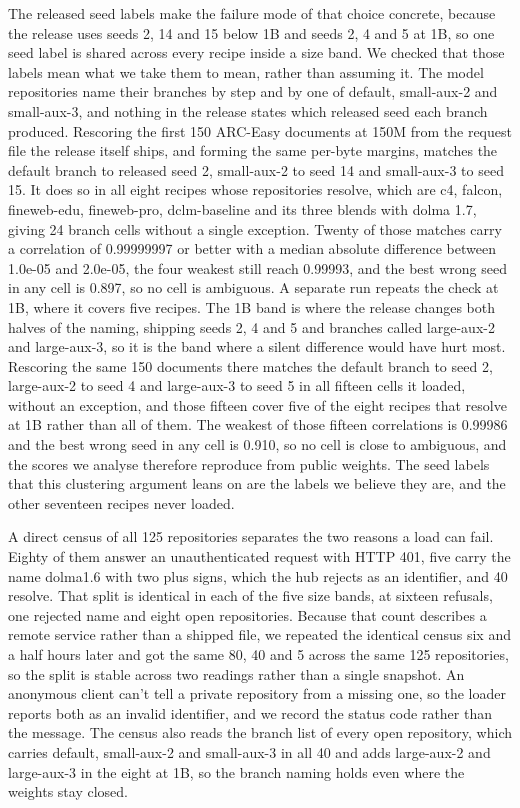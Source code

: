 The released seed labels make the failure mode of that choice concrete, because the release uses seeds 2, 14 and 15 below 1B and seeds 2, 4 and 5 at 1B, so one seed label is shared across every recipe inside a size band. We checked that those labels mean what we take them to mean, rather than assuming it. The model repositories name their branches by step and by one of default, small-aux-2 and small-aux-3, and nothing in the release states which released seed each branch produced. Rescoring the first 150 ARC-Easy documents at 150M from the request file the release itself ships, and forming the same per-byte margins, matches the default branch to released seed 2, small-aux-2 to seed 14 and small-aux-3 to seed 15. It does so in all eight recipes whose repositories resolve, which are c4, falcon, fineweb-edu, fineweb-pro, dclm-baseline and its three blends with dolma 1.7, giving 24 branch cells without a single exception. Twenty of those matches carry a correlation of 0.99999997 or better with a median absolute difference between 1.0e-05 and 2.0e-05, the four weakest still reach 0.99993, and the best wrong seed in any cell is 0.897, so no cell is ambiguous. A separate run repeats the check at 1B, where it covers five recipes. The 1B band is where the release changes both halves of the naming, shipping seeds 2, 4 and 5 and branches called large-aux-2 and large-aux-3, so it is the band where a silent difference would have hurt most. Rescoring the same 150 documents there matches the default branch to seed 2, large-aux-2 to seed 4 and large-aux-3 to seed 5 in all fifteen cells it loaded, without an exception, and those fifteen cover five of the eight recipes that resolve at 1B rather than all of them. The weakest of those fifteen correlations is 0.99986 and the best wrong seed in any cell is 0.910, so no cell is close to ambiguous, and the scores we analyse therefore reproduce from public weights. The seed labels that this clustering argument leans on are the labels we believe they are, and the other seventeen recipes never loaded.

A direct census of all 125 repositories separates the two reasons a load can fail. Eighty of them answer an unauthenticated request with HTTP 401, five carry the name dolma1.6 with two plus signs, which the hub rejects as an identifier, and 40 resolve. That split is identical in each of the five size bands, at sixteen refusals, one rejected name and eight open repositories. Because that count describes a remote service rather than a shipped file, we repeated the identical census six and a half hours later and got the same 80, 40 and 5 across the same 125 repositories, so the split is stable across two readings rather than a single snapshot. An anonymous client can't tell a private repository from a missing one, so the loader reports both as an invalid identifier, and we record the status code rather than the message. The census also reads the branch list of every open repository, which carries default, small-aux-2 and small-aux-3 in all 40 and adds large-aux-2 and large-aux-3 in the eight at 1B, so the branch naming holds even where the weights stay closed.

